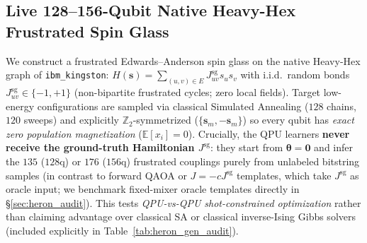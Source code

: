 \documentclass[11pt]{article}
\begin{document}
\begin{table}[t!]
\centering
\caption{\textbf{IBM Heron R2 ($156$q) Calibration Audit and Noise-Pruned $128$q \texttt{ibm\_kingston} Subgraph.} Pruning eliminates all $>5\%$ readout outliers while preserving $0$ SWAP routing overhead.}
\label{tab:heron_audit}
\small
{}
\end{table}

\subsection{Live 128--156-Qubit Native Heavy-Hex Frustrated Spin Glass}
\label{sec:heron_spinglass}
We construct a frustrated Edwards--Anderson spin glass on the native Heavy-Hex graph of \texttt{ibm\_kingston}: $H(\mathbf{s}) = \sum_{(u,v)\in E} J^{\text{sg}}_{uv} s_u s_v$ with i.i.d.\ random bonds $J^{\text{sg}}_{uv}\in\{-1,+1\}$ (non-bipartite frustrated cycles; zero local fields). Target low-energy configurations are sampled via classical Simulated Annealing ($128$ chains, $120$ sweeps) and explicitly $\mathbb{Z}_2$-symmetrized ($\{\mathbf{s}_m, -\mathbf{s}_m\}$) so every qubit has \emph{exact zero population magnetization} ($\mathbb{E}[x_i]{=}0$). Crucially, the QPU learners \textbf{never receive the ground-truth Hamiltonian $J^{\text{sg}}$}: they start from $\boldsymbol{\theta}{=}\mathbf{0}$ and infer the $135$ ($128$q) or $176$ ($156$q) frustrated couplings purely from unlabeled bitstring samples (in contrast to forward QAOA or $J{=}{-}cJ^{\text{sg}}$ templates, which take $J^{\text{sg}}$ as oracle input; we benchmark fixed-mixer oracle templates directly in \S\ref{sec:heron_audit}). This tests \emph{QPU-vs-QPU shot-constrained optimization} rather than claiming advantage over classical SA or classical inverse-Ising Gibbs solvers (included explicitly in Table~\ref{tab:heron_gen_audit}).
\end{document}
